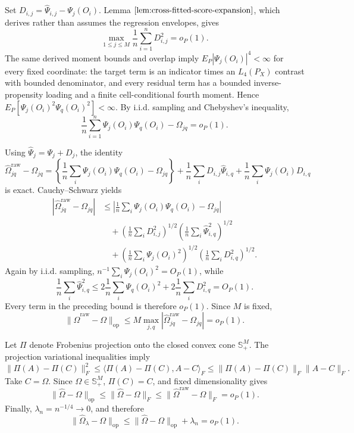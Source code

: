 Set \(D_{i,j}=\widehat\Psi_{i,j}-\Psi_j(O_i)\). Lemma \(\ref{lem:cross-fitted-score-expansion}\), which derives rather than assumes the regression envelopes, gives
\[
 \max_{1\le j\le M}\frac1n\sum_{i=1}^nD_{i,j}^2=o_P(1).
\]
The same derived moment bounds and overlap imply \(E_P|\Psi_j(O_i)|^4<\infty\) for every fixed coordinate: the target term is an indicator times an \(L_4(P_X)\) contrast with bounded denominator, and every residual term has a bounded inverse-propensity loading and a finite cell-conditional fourth moment. Hence \(E_P[\Psi_j(O_i)^2\Psi_q(O_i)^2]<\infty\). By i.i.d. sampling and Chebyshev's inequality,
\[
 \frac1n\sum_{i=1}^n\Psi_j(O_i)\Psi_q(O_i)-\Omega_{jq}=o_P(1).
\]

Using \(\widehat\Psi_j=\Psi_j+D_j\), the identity
\[
 \widehat\Omega^{\mathrm{raw}}_{jq}-\Omega_{jq}
 =\left\{\frac1n\sum_i\Psi_j(O_i)\Psi_q(O_i)-\Omega_{jq}\right\}
 +\frac1n\sum_iD_{i,j}\widehat\Psi_{i,q}
 +\frac1n\sum_i\Psi_j(O_i)D_{i,q}
\]
is exact. Cauchy--Schwarz yields
\[
\begin{aligned}
 |\widehat\Omega^{\mathrm{raw}}_{jq}-\Omega_{jq}|
 &\le \left|\frac1n\sum_i\Psi_j(O_i)\Psi_q(O_i)-\Omega_{jq}\right|\\
 &\quad+\left(\frac1n\sum_iD_{i,j}^2\right)^{1/2}
       \left(\frac1n\sum_i\widehat\Psi_{i,q}^2\right)^{1/2}\\
 &\quad+\left(\frac1n\sum_i\Psi_j(O_i)^2\right)^{1/2}
       \left(\frac1n\sum_iD_{i,q}^2\right)^{1/2}.
\end{aligned}
\]
Again by i.i.d. sampling, \(n^{-1}\sum_i\Psi_j(O_i)^2=O_P(1)\), while
\[
 \frac1n\sum_i\widehat\Psi_{i,q}^2
 \le2\frac1n\sum_i\Psi_q(O_i)^2+2\frac1n\sum_iD_{i,q}^2=O_P(1).
\]
Every term in the preceding bound is therefore \(o_P(1)\). Since \(M\) is fixed,
\[
 \|\widehat\Omega^{\mathrm{raw}}-\Omega\|_{\mathrm{op}}
 \le M\max_{j,q}|\widehat\Omega^{\mathrm{raw}}_{jq}-\Omega_{jq}|=o_P(1).
\]

Let \(\Pi\) denote Frobenius projection onto the closed convex cone \(\mathbb S_+^M\). The projection variational inequalities imply
\[
 \|\Pi(A)-\Pi(C)\|_F^2
 \le\langle\Pi(A)-\Pi(C),A-C\rangle_F
 \le\|\Pi(A)-\Pi(C)\|_F\|A-C\|_F.
\]
Take \(C=\Omega\). Since \(\Omega\in\mathbb S_+^M\), \(\Pi(C)=C\), and fixed dimensionality gives
\[
 \|\widehat\Omega-\Omega\|_{\mathrm{op}}
 \le\|\widehat\Omega-\Omega\|_F
 \le\|\widehat\Omega^{\mathrm{raw}}-\Omega\|_F=o_P(1).
\]
Finally, \(\lambda_n=n^{-1/4}\to0\), and therefore
\[
 \|\widehat\Omega_\lambda-\Omega\|_{\mathrm{op}}
 \le\|\widehat\Omega-\Omega\|_{\mathrm{op}}+\lambda_n=o_P(1).
\]